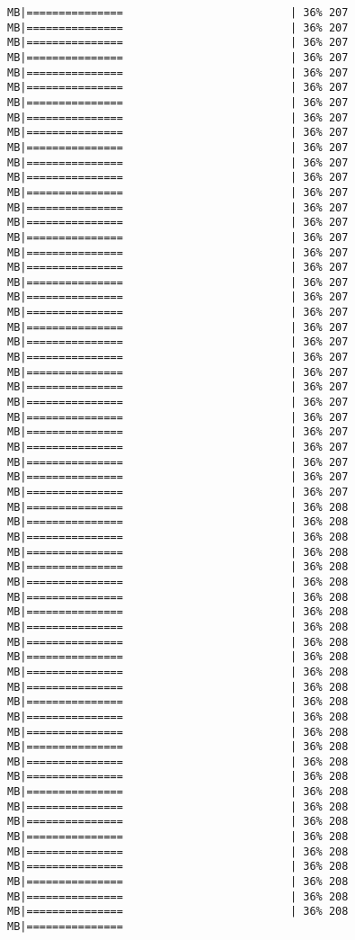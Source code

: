 \documentclass[
]{article}
\begin{document}
\begin{verbatim}
MB|===============                          | 36% 207 MB|===============                          | 36% 207 MB|===============                          | 36% 207 MB|===============                          | 36% 207 MB|===============                          | 36% 207 MB|===============                          | 36% 207 MB|===============                          | 36% 207 MB|===============                          | 36% 207 MB|===============                          | 36% 207 MB|===============                          | 36% 207 MB|===============                          | 36% 207 MB|===============                          | 36% 207 MB|===============                          | 36% 207 MB|===============                          | 36% 207 MB|===============                          | 36% 207 MB|===============                          | 36% 207 MB|===============                          | 36% 207 MB|===============                          | 36% 207 MB|===============                          | 36% 207 MB|===============                          | 36% 207 MB|===============                          | 36% 207 MB|===============                          | 36% 207 MB|===============                          | 36% 207 MB|===============                          | 36% 207 MB|===============                          | 36% 207 MB|===============                          | 36% 207 MB|===============                          | 36% 207 MB|===============                          | 36% 207 MB|===============                          | 36% 207 MB|===============                          | 36% 207 MB|===============                          | 36% 207 MB|===============                          | 36% 207 MB|===============                          | 36% 207 MB|===============                          | 36% 208 MB|===============                          | 36% 208 MB|===============                          | 36% 208 MB|===============                          | 36% 208 MB|===============                          | 36% 208 MB|===============                          | 36% 208 MB|===============                          | 36% 208 MB|===============                          | 36% 208 MB|===============                          | 36% 208 MB|===============                          | 36% 208 MB|===============                          | 36% 208 MB|===============                          | 36% 208 MB|===============                          | 36% 208 MB|===============                          | 36% 208 MB|===============                          | 36% 208 MB|===============                          | 36% 208 MB|===============                          | 36% 208 MB|===============                          | 36% 208 MB|===============                          | 36% 208 MB|===============                          | 36% 208 MB|===============                          | 36% 208 MB|===============                          | 36% 208 MB|===============                          | 36% 208 MB|===============                          | 36% 208 MB|===============                          | 36% 208 MB|===============                          | 36% 208 MB|===============                          | 36% 208 MB|===============                          | 36% 208 MB|===============       
\end{verbatim}
\end{document}
